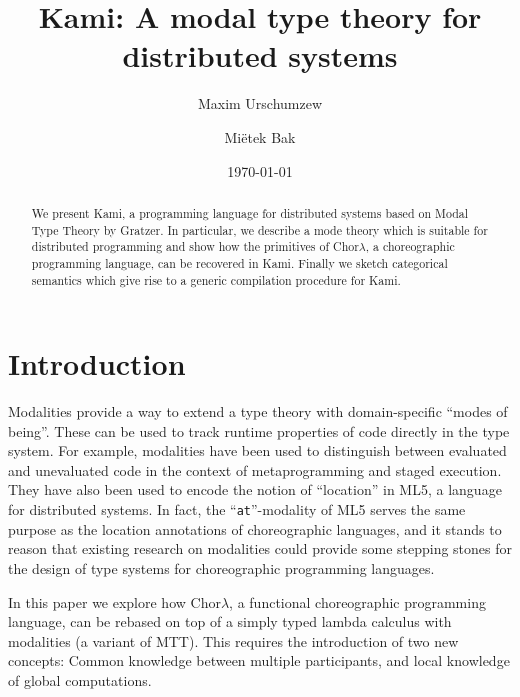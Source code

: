 \documentclass{scrartcl}
\title{Kami: A modal type theory for distributed systems}
\author{Maxim Urschumzew \and Miëtek Bak}
\date{\today}
\theoremstyle{definition}
\theoremstyle{plain}
\begin{document}
\maketitle


\newcommand{\primitive}[1]{\textsf{\textbf{#1}}}
\newcommand{\primitiveMath}[1]{\mathsf{\mathbf{#1}}}
\newcommand{\ChorMTT}{Chor${}_{\textrm{MTT}}$}
\newcommand{\onleftarrow}[1]{\mathop{\smash{\xleftarrow{#1}}}}
\newcommand{\ProcMTT}{Proc${}_{\textrm{MTT}}$}


\begin{abstract}
  We present Kami, a programming language for distributed systems based on Modal
  Type Theory\cite{gratzer2023syntax} by Gratzer. In particular, we describe a
  mode theory which is suitable for distributed programming and show how the
  primitives of Chor$\lambda$\cite{cruz2022functional}, a choreographic programming language, can be
  recovered in Kami. Finally we sketch categorical semantics which give rise to
  a generic compilation procedure for Kami.
\end{abstract}

\section{Introduction}
Modalities provide a way to extend a type theory with domain-specific
``modes of being''. These can be used to track runtime properties of code
directly in the type system. For example, modalities have been used to
distinguish between evaluated and unevaluated code in the context of
metaprogramming and staged execution\cite{davies2001modal}. They have also been used to encode the
notion of ``location'' in ML5\cite{murphy2008modal}, a language for distributed
systems. In fact, the ``\texttt{at}''-modality of ML5 serves the same purpose as the
location annotations of choreographic
languages\cite{cruz2022functional,giallorenzo2024object}, and it stands to
reason that existing research on modalities could provide some stepping stones
for the design of type systems for choreographic programming languages.

\medskip

In this paper we explore how Chor$\lambda$\cite{cruz2022functional}, a functional choreographic
programming language, can be rebased on top of a simply typed lambda calculus
with modalities (a variant of MTT\cite{gratzer2023syntax}).
This requires the introduction of two new concepts: Common
knowledge between multiple participants, and local knowledge of global computations.
\end{document}
